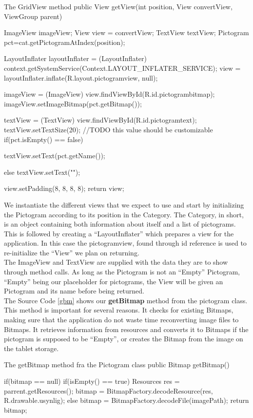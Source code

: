 \begin{source}[{gridviewm}]{The GridView method}
	public View getView(int position, View convertView, ViewGroup parent) 
	{
		ImageView imageView;
		View view = convertView;
		TextView textView;
		Pictogram pct=cat.getPictogramAtIndex(position);

		LayoutInflater layoutInflater = (LayoutInflater) context.getSystemService(Context.LAYOUT_INFLATER_SERVICE);
		view = layoutInflater.inflate(R.layout.pictogramview, null);

		imageView = (ImageView) view.findViewById(R.id.pictogrambitmap); 
		imageView.setImageBitmap(pct.getBitmap());

		textView = (TextView) view.findViewById(R.id.pictogramtext);
		textView.setTextSize(20);	//TODO this value should be customizable
		if(pct.isEmpty() == false)
		{

			textView.setText(pct.getName());
		}
		else
		{
			textView.setText("");
		}

		view.setPadding(8, 8, 8, 8);
		return view;
	}
\end{source}
We instantiate the different views that we expect to use and start by initializing the Pictogram according to its position in the Category.
The Category, in short, is an object containing both information about itself and a list of pictograms.
This is followed by creating a ``LayoutInflater'' which prepares a view for the application.
In this case the pictogramview, found through id reference is used to re-initialize the ``View'' we plan on returning.\\
The ImageView and TextView are supplied with the data they are to show through method calls. 
As long as the Pictogram is not an ``Empty'' Pictogram, ``Empty'' being our placeholder for pictograms, the View will be given an Pictogram and its name before being returned.\\

The Source Code \ref{gbm} shows our \textbf{getBitmap} method from the pictogram class.
This method is important for several reasons. It checks for existing Bitmaps, making sure that the application do not waste time reconverting image files to Bitmaps.
It retrieves information from resources and converts it to Bitmaps if the pictogram is supposed to be ``Empty'', or creates the Bitmap from the image on the tablet storage.

\begin{source}[{gbm}]{The getBitmap method fra the Pictogram class}
	public Bitmap getBitmap()
	{
		if(bitmap == null)
		{
			if(isEmpty() == true)
			{
				Resources res = parrent.getResources();
				bitmap = BitmapFactory.decodeResource(res, R.drawable.usynlig);
			}
			else
			{
				bitmap = BitmapFactory.decodeFile(imagePath);
			}
		}
		return bitmap;
	
	}
\end{source}


